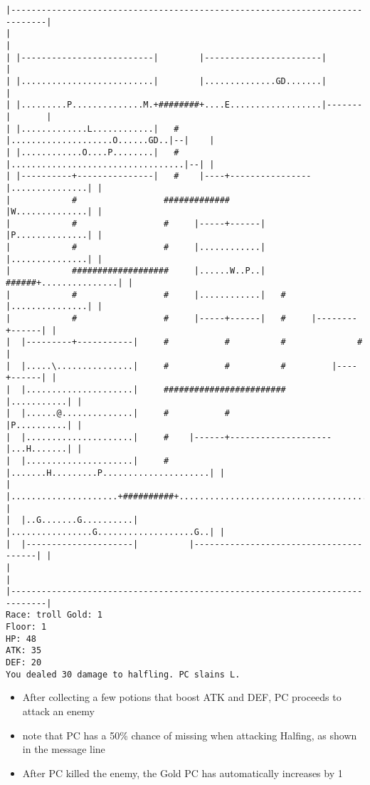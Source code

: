\documentclass[11pt]{article}
\theoremstyle{plain}
\begin{document}
\begin{Verbatim}[fontsize=\scriptsize]
|-----------------------------------------------------------------------------|
|                                                                             |
| |--------------------------|        |-----------------------|               |
| |..........................|        |..............GD.......|               |
| |.........P..............M.+########+....E..................|-------|       |
| |.............L............|   #    |....................O......GD..|--|    |
| |............O....P........|   #    |..................................|--| |
| |----------+---------------|   #    |----+----------------|...............| |
|            #                 #############                |W..............| |
|            #                 #     |-----+------|         |P..............| |
|            #                 #     |............|         |...............| |
|            ###################     |......W..P..|   ######+...............| |
|            #                 #     |............|   #     |...............| |
|            #                 #     |-----+------|   #     |--------+------| |
|  |---------+-----------|     #           #          #              #        |
|  |.....\...............|     #           #          #         |----+------| |
|  |.....................|     ########################         |...........| |
|  |......@..............|     #           #                    |P..........| |
|  |.....................|     #    |------+--------------------|...H.......| |
|  |.....................|     #    |.......H.........P.....................| |
|  |.....................+##########+.......................................| |
|  |..G.......G..........|          |................G...................G..| |
|  |---------------------|          |---------------------------------------| |
|                                                                             |
|-----------------------------------------------------------------------------|
Race: troll Gold: 1                                                    Floor: 1
HP: 48
ATK: 35
DEF: 20
You dealed 30 damage to halfling. PC slains L.
\end{Verbatim}

\begin{itemize}
    \item After collecting a few potions that boost ATK and DEF, PC
          proceeds to attack an enemy
    \item note that PC has a 50\% chance of missing when attacking Halfing,
          as shown in the message line
    \item After PC killed the enemy, the Gold PC has automatically increases by 1
\end{itemize}
\end{document}
